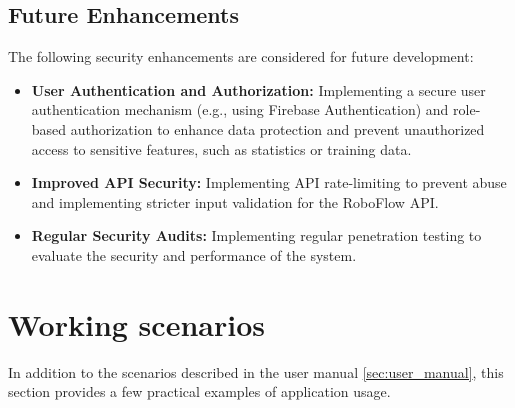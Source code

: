 \subsection{Future Enhancements}

The following security enhancements are considered for future development:

\begin{itemize}
    \item \textbf{User Authentication and Authorization:}  Implementing a secure user authentication mechanism (e.g., using Firebase Authentication) and role-based authorization to enhance data protection and prevent unauthorized access to sensitive features, such as statistics or training data.
    \item \textbf{Improved API Security:} Implementing API rate-limiting to prevent abuse and implementing stricter input validation for the RoboFlow API.
     \item \textbf{Regular Security Audits:} Implementing regular penetration testing to evaluate the security and performance of the system.
\end{itemize}

\section{Working scenarios}

In addition to the scenarios described in the user manual \ref{sec:user_manual}, this section provides a few practical examples of application usage.

